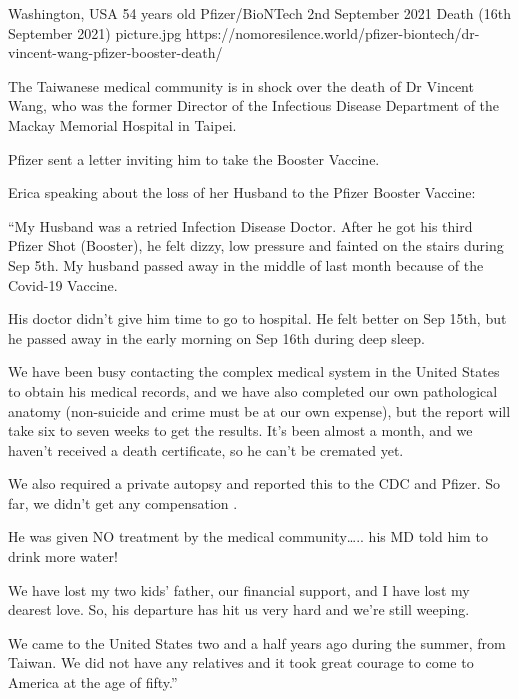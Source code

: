 {Washington, USA}
{54 years old}
{Pfizer/BioNTech}
{2nd September 2021}
{Death (16th September 2021)}
{picture.jpg}
{https://nomoresilence.world/pfizer-biontech/dr-vincent-wang-pfizer-booster-death/}
{

The Taiwanese medical community is in shock over the death of Dr Vincent Wang,
who was the former Director of the Infectious Disease Department of the Mackay
Memorial Hospital in Taipei.

Pfizer sent a letter inviting him to take the Booster Vaccine.

Erica speaking about the loss of her Husband to the Pfizer Booster Vaccine:

“My Husband was a retried Infection Disease Doctor. After he got his third
Pfizer Shot (Booster), he felt dizzy, low pressure and fainted on the stairs
during Sep 5th. My husband passed away in the middle of last month because of
the Covid-19 Vaccine.

His doctor didn’t give him time to go to hospital. He felt better on Sep 15th,
but he passed away in the early morning on Sep 16th during deep sleep.

We have been busy contacting the complex medical system in the United States to
obtain his medical records, and we have also completed our own pathological
anatomy (non-suicide and crime must be at our own expense), but the report will
take six to seven weeks to get the results. It’s been almost a month, and we
haven’t received a death certificate, so he can’t be cremated yet.

We also required a private autopsy and reported this to the CDC and Pfizer. So
far, we didn’t get any compensation .

He was given NO treatment by the medical community….. his MD told him to drink
more water!

We have lost my two kids’ father, our financial support, and I have lost my
dearest love. So, his departure has hit us very hard and we’re still weeping.

We came to the United States two and a half years ago during the summer, from
Taiwan. We did not have any relatives and it took great courage to come to
America at the age of fifty.”

}
